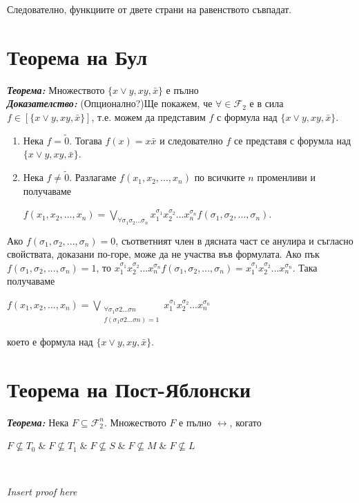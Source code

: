 \documentclass[11pt]{article} %
\newcommand{\italicBold}[1]{\textbf{\emph{#1}}}
\newcommand{\theorem}{\italicBold{Теорема: }}
\newcommand{\proof}{\italicBold{Доказателство: }}
\newcommand{\curlies}[1]{\{#1\}}
\newcommand{\enumNum}{\renewcommand{\theenumi}{\arabic{enumi}}}
\begin{document}
Следователно, функциите от двете страни на равенството съвпадат.

\section{Теорема на Бул}
\theorem Множеството $\curlies{x \vee y, xy, \bar{x}}$ е пълно\\

\proof (Опционално?)Ще покажем, че $\forall \in \mathcal{F}_{2}$ е в сила $f \in [\curlies{x \vee y, xy, \bar{x}}]$, т.е. можем да представим $f$ с формула над $\curlies{x \vee y, xy, \bar{x}}$.

\enumNum
\begin{enumerate}
	\item Нека $f = \tilde{0}$. Тогава $f(x) = x\bar{x}$ и следователно $f$ се представя с форумла над $\curlies{x \vee y, xy, \bar{x}}$. \\
	\item Нека $f \neq \tilde{0}$. Разлагаме $f(x_{1}, x_{2}, ..., x_{n})$ по всичките $n$ променливи и получаваме \\
		\centerline{$f(x_{1}, x_{2}, ..., x_{n}) = \underset{\forall \sigma_{1}\sigma_{2}...\sigma_{n}}{\bigvee}x_{1}^{\sigma_1} x_{2}^{\sigma_2} ... x_{n}^{\sigma_n} f(\sigma_{1}, \sigma_{2}, ..., \sigma_{n})$.}
\end{enumerate}

Ако $f(\sigma_{1}, \sigma_{2}, ..., \sigma_{n}) = 0$, съответният член в дясната част се анулира и съгласно свойствата, доказани по-горе, може да не участва във формулата. Ако пък $f(\sigma_{1}, \sigma_{2}, ..., \sigma_{n}) = 1$, то $x_{1}^{\sigma_1}x_{2}^{\sigma_2}... x_{n}^{\sigma_n} f(\sigma_{1}, \sigma_{2}, ..., \sigma_{n}) = x_{1}^{\sigma_1}x_{2}^{\sigma_2}... x_{n}^{\sigma_n}$. Така получаваме \\ 

\centerline{$f(x_{1}, x_{2}, ..., x_{n}) =   \bigvee_{\substack{\forall \sigma_{1} \sigma{2}...\sigma{n} \\ f(\sigma_{1} \sigma{2}...\sigma{n}) = 1}} x_{1}^{\sigma_1}x_{2}^{\sigma_2}...x_{n}^{\sigma_n}$}

което е формула над $\curlies{x \vee y, xy, \bar{x}}$.

\section{Теорема на Пост-Яблонски}
\theorem Нека $F \subseteq \mathcal{F}^{n}_{2}$. Множеството $F$ е пълно $\leftrightarrow$, когато \\
\centerline{$F\not\subseteq T_{0}\;\&\;F \not\subseteq T_{1}\;\&\;F \not\subseteq S\;\&\;F \not\subseteq M\;\&\;F \not\subseteq L$}\\
\centerline{\textit{Insert proof here}}
\end{document}
